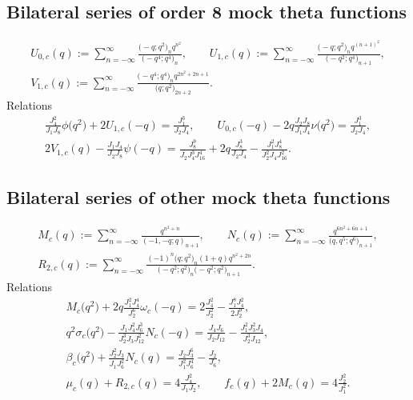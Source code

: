 \documentclass[10pt,a4paper]{amsart}
\numberwithin{equation}{section}
\begin{document}
\subsection{Bilateral series of order 8 mock theta functions}

\begin{gather*}
U_{0,c}(q):= \sum_{n=-\infty}^{\infty}\frac{\bigl(-q;q^2\bigr)_nq^{n^2}}{\bigl(-q^4;q^4\bigr)_n},\qquad
 U_{1,c}(q):= \sum_{n=-\infty}^{\infty}\frac{\bigl(-q;q^2\bigr)_nq^{(n+1)^2}}
{\bigl(-q^2;q^4\bigr)_{n+1}},\\
V_{1,c}(q):= \sum_{n=-\infty}^{\infty}\frac{\bigl(-q^4;q^4\bigr)_n q^{2n^2+2n+1}}{\bigl(q;q^2\bigr)_{2n+2}}.
\end{gather*}
Relations
\begin{gather*}
 \frac{J_4^2}{J_1J_8}\phi\bigl(q^2\bigr)+2U_{1,c}(-q)=\frac{J_1^3}{J_2J_4},\qquad
 U_{0,c}(-q)-2q\frac{J_2J_8}{J_1J_4}\nu\bigl(q^2\bigr)=\frac{J_1^3}{J_2J_4},\\
 2V_{1,c}(q)-\frac{J_1J_4}{J_2J_8}\psi(-q)=\frac{J_8^9}{J_2J_4^3J_{16}^4}+2q\frac{J_8^3}{J_2J_4}-\frac{J_1^2J_8^4}{J_2^2J_4J_{16}^2}.
\end{gather*}

\subsection{Bilateral series of other mock theta functions}
\begin{gather*}
M_c(q):= \sum_{n=-\infty}^{\infty}\frac{q^{n^2+n}}{(-1,-q;q)_{n+1}},\qquad
N_c(q):=\sum_{n=-\infty}^{\infty}\frac{q^{6n^2+6n+1}}{\bigl(q,q^5;q^6\bigr)_{n+1}},\\
R_{2,c}(q):= \sum_{n=-\infty}^{\infty}\frac{(-1)^n\bigl(q;q^2\bigr)_n(1+q)q^{n^2+2n}}
{\bigl(-q^2;q^2\bigr)_n\bigl(-q^2;q^2\bigr)_{n+1}}.
\end{gather*}
Relations
\begin{gather*}
 M_c\bigl(q^2\bigr)+2q\frac{J_1^2J_4^4}{J_2^6}\omega_c(-q)
=2\frac{J_4^2}{J_2^2}-\frac{J_1^8J_4^2}{2J_2^9},\\
 q^2\sigma_c\bigl(q^2\bigr)-\frac{J_1J_4^2J_6^3}{J_2^3J_3J_{12}^2}N_c(-q)
=\frac{J_4J_6}{J_2J_{12}}-\frac{J_1^2J_3^2J_4}{J_2^3J_{12}},\\
 \beta_c\bigl(q^2\bigr)+\frac{J_2^2J_3}{J_1J_6^2}N_c(q)
=\frac{J_2J_3^6}{J_1^2J_6^4}-\frac{J_2}{J_6},\\
 \mu_c(q)+R_{2,c}(q)=4\frac{J_4^2}{J_1J_2},\qquad
 f_c(q)+2M_c(q)=4\frac{J_2^2}{J_1^2}.
\end{gather*}
\end{document}

